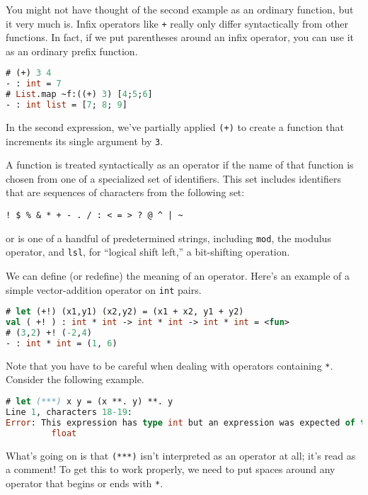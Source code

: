 You might not have thought of the second example as an ordinary
function, but it very much is. Infix operators like
\passthrough{\lstinline!+!} really only differ syntactically from other
functions. In fact, if we put parentheses around an infix operator, you
can use it as an ordinary prefix function.

\begin{lstlisting}[language=Caml]
# (+) 3 4
- : int = 7
# List.map ~f:((+) 3) [4;5;6]
- : int list = [7; 8; 9]
\end{lstlisting}

In the second expression, we've partially applied
\passthrough{\lstinline!(+)!} to create a function that increments its
single argument by \passthrough{\lstinline!3!}.

A function is treated syntactically as an operator if the name of that
function is chosen from one of a specialized set of identifiers. This
set includes identifiers that are sequences of characters from the
following set:

\begin{lstlisting}
! $ % & * + - . / : < = > ? @ ^ | ~
\end{lstlisting}

or is one of a handful of predetermined strings, including
\passthrough{\lstinline!mod!}, the modulus operator, and
\passthrough{\lstinline!lsl!}, for ``logical shift left,'' a
bit-shifting operation.

We can define (or redefine) the meaning of an operator. Here's an
example of a simple vector-addition operator on
\passthrough{\lstinline!int!} pairs.

\begin{lstlisting}[language=Caml]
# let (+!) (x1,y1) (x2,y2) = (x1 + x2, y1 + y2)
val ( +! ) : int * int -> int * int -> int * int = <fun>
# (3,2) +! (-2,4)
- : int * int = (1, 6)
\end{lstlisting}

Note that you have to be careful when dealing with operators containing
\passthrough{\lstinline!*!}. Consider the following example.

\begin{lstlisting}[language=Caml]
# let (***) x y = (x **. y) **. y
Line 1, characters 18-19:
Error: This expression has type int but an expression was expected of type
         float
\end{lstlisting}

What's going on is that \passthrough{\lstinline!(***)!} isn't
interpreted as an operator at all; it's read as a comment! To get this
to work properly, we need to put spaces around any operator that begins
or ends with \passthrough{\lstinline!*!}.

